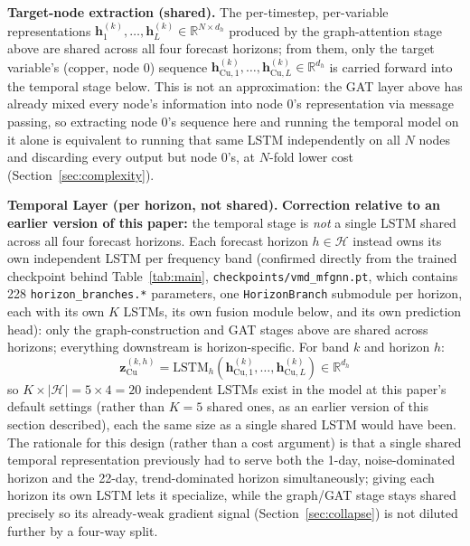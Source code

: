 \documentclass[journal]{IEEEtran}
\begin{document}
\textbf{Target-node extraction (shared).} The per-timestep, per-variable representations $\mathbf{h}^{(k)}_{1},\ldots,\mathbf{h}^{(k)}_{L} \in \mathbb{R}^{N \times d_h}$ produced by the graph-attention stage above are shared across all four forecast horizons; from them, only the target variable's (copper, node 0) sequence $\mathbf{h}^{(k)}_{\text{Cu},1},\ldots,\mathbf{h}^{(k)}_{\text{Cu},L} \in \mathbb{R}^{d_h}$ is carried forward into the temporal stage below. This is not an approximation: the GAT layer above has already mixed every node's information into node 0's representation via message passing, so extracting node 0's sequence here and running the temporal model on it alone is equivalent to running that same LSTM independently on all $N$ nodes and discarding every output but node 0's, at $N$-fold lower cost (Section~\ref{sec:complexity}).

\textbf{Temporal Layer (per horizon, not shared).} \textbf{Correction relative to an earlier version of this paper:} the temporal stage is \emph{not} a single LSTM shared across all four forecast horizons. Each forecast horizon $h \in \mathcal{H}$ instead owns its own independent LSTM per frequency band (confirmed directly from the trained checkpoint behind Table~\ref{tab:main}, \texttt{checkpoints/vmd\_mfgnn.pt}, which contains 228 \texttt{horizon\_branches.*} parameters, one \texttt{HorizonBranch} submodule per horizon, each with its own $K$ LSTMs, its own fusion module below, and its own prediction head): only the graph-construction and GAT stages above are shared across horizons; everything downstream is horizon-specific. For band $k$ and horizon $h$:
\begin{equation}
\label{eq:lstm}
\mathbf{z}^{(k,h)}_{\text{Cu}} = \text{LSTM}_h\!\left(\mathbf{h}^{(k)}_{\text{Cu},1}, \ldots, \mathbf{h}^{(k)}_{\text{Cu},L}\right) \in \mathbb{R}^{d_h}
\end{equation}
so $K \times |\mathcal{H}| = 5 \times 4 = 20$ independent LSTMs exist in the model at this paper's default settings (rather than $K=5$ shared ones, as an earlier version of this section described), each the same size as a single shared LSTM would have been. The rationale for this design (rather than a cost argument) is that a single shared temporal representation previously had to serve both the 1-day, noise-dominated horizon and the 22-day, trend-dominated horizon simultaneously; giving each horizon its own LSTM lets it specialize, while the graph/GAT stage stays shared precisely so its already-weak gradient signal (Section~\ref{sec:collapse}) is not diluted further by a four-way split.
\end{document}
